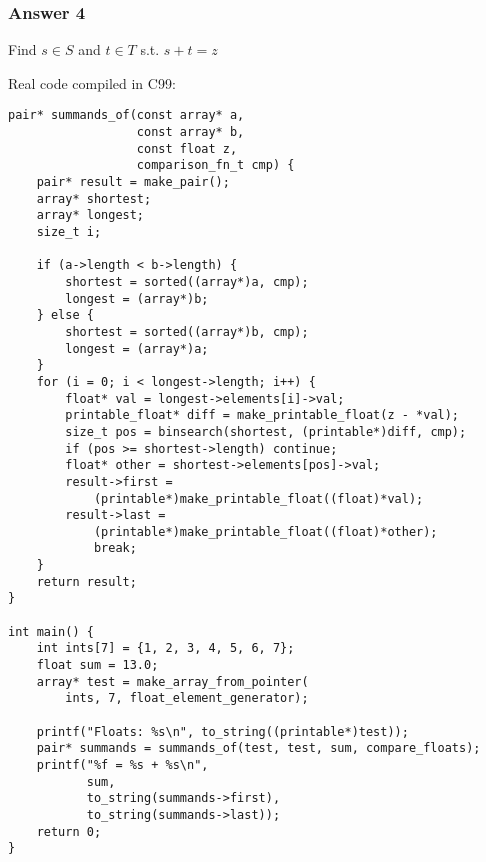 \documentclass[11pt]{article}
\begin{document}
\subsubsection{Answer 4}
\label{sec:orgheadline6}
\begin{algorithm}
  \caption{Find $s \in S$ and $t \in T$ s.t. $s + t = z$}
  \begin{algorithmic}
     \Then
    \State {}
    \Else
    \State {}
    \EndIf
    \State {}
     \Then
    \State {}
    \State {}
    \EndIf
    \EndFor
    \State {}
    \EndProcedure
  \end{algorithmic}
\end{algorithm}

Real code compiled in C99:

\lstset{language=C,label= ,caption= ,captionpos=b,numbers=none}
\begin{lstlisting}
pair* summands_of(const array* a,
                  const array* b,
                  const float z,
                  comparison_fn_t cmp) {
    pair* result = make_pair();
    array* shortest;
    array* longest;
    size_t i;

    if (a->length < b->length) {
        shortest = sorted((array*)a, cmp);
        longest = (array*)b;
    } else {
        shortest = sorted((array*)b, cmp);
        longest = (array*)a;
    }
    for (i = 0; i < longest->length; i++) {
        float* val = longest->elements[i]->val;
        printable_float* diff = make_printable_float(z - *val);
        size_t pos = binsearch(shortest, (printable*)diff, cmp);
        if (pos >= shortest->length) continue;
        float* other = shortest->elements[pos]->val;
        result->first =
            (printable*)make_printable_float((float)*val);
        result->last =
            (printable*)make_printable_float((float)*other);
            break;
    }
    return result;
}

int main() {
    int ints[7] = {1, 2, 3, 4, 5, 6, 7};
    float sum = 13.0;
    array* test = make_array_from_pointer(
        ints, 7, float_element_generator);

    printf("Floats: %s\n", to_string((printable*)test));
    pair* summands = summands_of(test, test, sum, compare_floats);
    printf("%f = %s + %s\n",
           sum,
           to_string(summands->first),
           to_string(summands->last));
    return 0;
}
\end{lstlisting}
\end{document}
